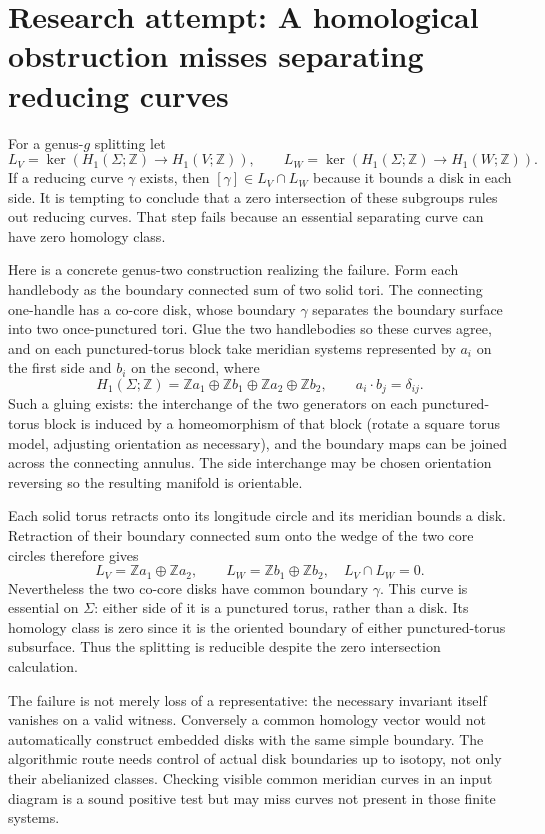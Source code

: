 \documentclass[11pt]{article}
\begin{document}
\section{Research attempt: A homological obstruction misses separating reducing curves}
For a genus-$g$ splitting let
\[
 L_V=\ker(H_1(\Sigma;\mathbb Z)\to H_1(V;\mathbb Z)),\qquad
 L_W=\ker(H_1(\Sigma;\mathbb Z)\to H_1(W;\mathbb Z)).
\]
If a reducing curve $\gamma$ exists, then $[\gamma]\in L_V\cap L_W$ because
it bounds a disk in each side. It is tempting to conclude that a zero
intersection of these subgroups rules out reducing curves. That step fails
because an essential separating curve can have zero homology class.

Here is a concrete genus-two construction realizing the failure. Form each
handlebody as the boundary connected sum of two solid tori. The connecting
one-handle has a co-core disk, whose boundary $\gamma$ separates the boundary
surface into two once-punctured tori. Glue the two handlebodies so these curves
agree, and on each punctured-torus block take meridian systems represented by
$a_i$ on the first side and $b_i$ on the second, where
\[
 H_1(\Sigma;\mathbb Z)=
 \mathbb Z a_1\oplus\mathbb Z b_1\oplus
 \mathbb Z a_2\oplus\mathbb Z b_2,
 \qquad a_i\cdot b_j=\delta_{ij}.
\]
Such a gluing exists: the interchange of the two generators on each
punctured-torus block is induced by a homeomorphism of that block (rotate a
square torus model, adjusting orientation as necessary), and the boundary maps
can be joined across the connecting annulus. The side interchange may be
chosen orientation reversing so the resulting manifold is orientable.

Each solid torus retracts onto its longitude circle and its meridian bounds a
disk. Retraction of their boundary connected sum onto the wedge of the two
core circles therefore gives
\[
 L_V=\mathbb Z a_1\oplus\mathbb Z a_2,\qquad
 L_W=\mathbb Z b_1\oplus\mathbb Z b_2,
 \quad L_V\cap L_W=0.
\]
Nevertheless the two co-core disks have common boundary $\gamma$. This curve
is essential on $\Sigma$: either side of it is a punctured torus, rather than
a disk. Its homology class is zero since it is the oriented boundary of either
punctured-torus subsurface. Thus the splitting is reducible despite the zero
intersection calculation.

The failure is not merely loss of a representative: the necessary invariant
itself vanishes on a valid witness. Conversely a common homology vector would
not automatically construct embedded disks with the same simple boundary.
The algorithmic route needs control of actual disk boundaries up to isotopy,
not only their abelianized classes. Checking visible common meridian curves in
an input diagram is a sound positive test but may miss curves not present in
those finite systems.
\end{document}

